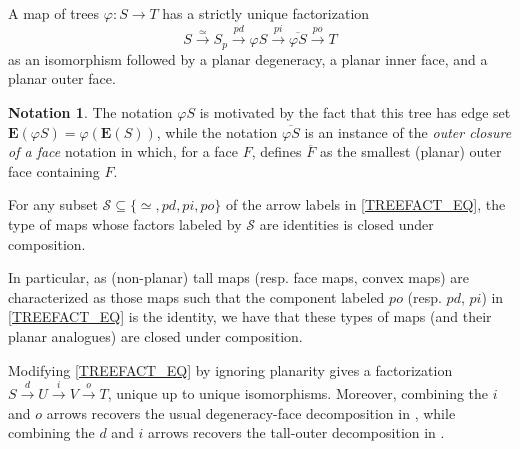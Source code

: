 \documentclass{hha}
\theoremstyle{definition} %
\newtheorem{notation}[theorem]{Notation}%
\begin{document}
\begin{proposition}
      \label{TREEFACT_PROP}
      A map of trees $\varphi \colon S \to T$ %
      has a strictly unique factorization
      \begin{equation}\label{TREEFACT_EQ}
              S \xrightarrow{\simeq}
              S_p \xrightarrow{pd} 
              \varphi S \xrightarrow{pi} 
              \overline{\varphi S} \xrightarrow{po} T
      \end{equation}
      as an isomorphism followed by a planar degeneracy, a planar inner face, and a planar outer face.
\end{proposition}


\begin{notation}\label{TREEFACT NOT}
      The notation $\varphi S$ is motivated by the fact that this tree has edge set
      $\boldsymbol{E}(\varphi S) = \varphi (\boldsymbol{E}(S))$,
      while the 
      notation $\overline{\varphi S}$ is an instance of the 
      \emph{outer closure of a face}
      notation in \cite[Not. 2.14]{BP_edss}
      which, for a face $F$, defines $\overline{F}$
      as the smallest (planar) outer face containing $F$.
\end{notation}

\begin{remark}
        \label{TREEFACTNAMES_REM}
    For any subset
	$\mathcal{S} \subseteq \{\simeq,pd,pi,po\}$
	of the arrow labels 
	in \eqref{TREEFACT_EQ},
	the type of maps whose
	factors labeled by $\mathcal{S}$ are identities 
	is closed under composition.

        In particular, as (non-planar) tall maps (resp. face maps, convex maps) are characterized as those maps such that
        the component labeled $po$ (resp. $pd$, $pi$)
        in \eqref{TREEFACT_EQ}
        is the identity,
        we have that these types of maps (and their planar analogues) are closed under composition.
\end{remark}

\begin{remark}\label{IGNPL REM}
	Modifying \eqref{TREEFACT_EQ} by ignoring planarity
	gives a factorization 
	$S \xrightarrow{d} U \xrightarrow{i} V
	\xrightarrow{o} T$,
	unique up to unique isomorphisms.
	Moreover, combining the $i$ and $o$ arrows
	recovers the usual degeneracy-face decomposition
	in \cite[Lemma 3.1]{MW07},
	while combining the $d$ and $i$ arrows recovers the 
	tall-outer decomposition in \cite[Prop. 3.36]{BP_geo}.
\end{remark}
\end{document}
